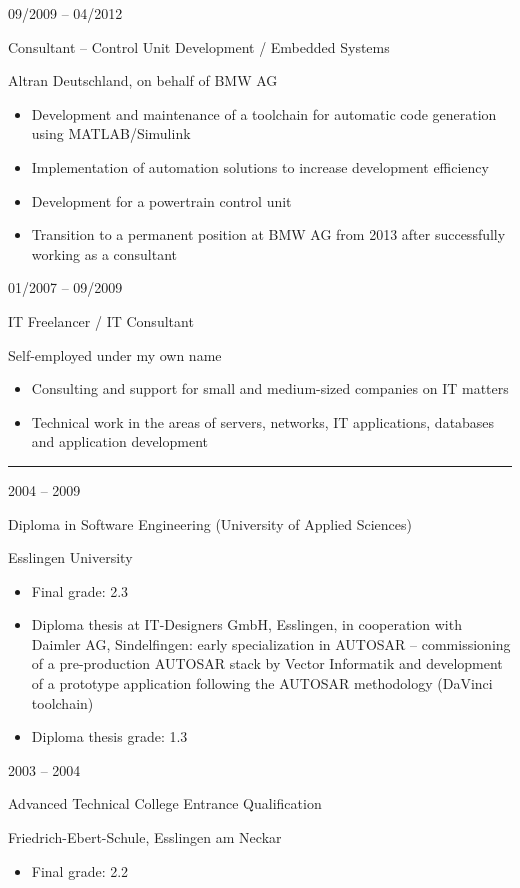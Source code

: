 \documentclass[a4paper,10pt]{article}
\newlength{\cvcolumngapwidth}
\newlength{\cvleftcolumnwidth}
\newlength{\cvrightcolumnwidth}
\newcommand{\cvsectionstyle}[1]{{\normalsize\cvsectionfont\textcolor{cvsectioncolor}{#1}}}
\newcommand{\cvtitlestyle}[1]{{\large\cvtitlefont\textcolor{cvtitlecolor}{#1}}}
\newcommand{\cvdurationstyle}[1]{{\small\cvdurationfont\textcolor{cvdurationcolor}{#1}}}
\newlength{\cvafteritemskipamount}
\newlength{\cvaftersectionskipamount}
\newlength{\cvaftertitleskipamount}
\newlength{\cvparskip}
\newcommand{\cvsection}[1]{
    \begin{minipage}[t]{\cvleftcolumnwidth}
        \raggedleft\cvsectionstyle{#1}
    \end{minipage}%
    \hspace{\cvcolumngapwidth}%
    \begin{minipage}[t]{\cvrightcolumnwidth}
        \textcolor{cvrulecolor}{\rule{\cvrightcolumnwidth}{0.3mm}}
    \end{minipage}
    \vspace{\cvaftersectionskipamount}
}
\newcommand{\cvitem}[2]{
    \begin{minipage}[t]{\cvleftcolumnwidth}
        \raggedleft #1
    \end{minipage}%
    \hspace{\cvcolumngapwidth}%
    \begin{minipage}[t]{\cvrightcolumnwidth}
        \setlength{\parskip}{\cvparskip} #2
    \end{minipage}
    \vspace{\cvafteritemskipamount}
}
\newcommand{\cvtitle}[1]{
    \cvtitlestyle{#1}
    \vspace{\cvaftertitleskipamount}
    \vspace{-\cvparskip}
}
\begin{document}
\cvitem{
    \cvdurationstyle{09/2009 -- 04/2012}
}{
    \cvtitle{Consultant -- Control Unit Development / Embedded Systems}

    Altran Deutschland, on behalf of BMW AG

    \begin{itemize}[leftmargin=*]
        \item Development and maintenance of a toolchain for automatic code generation using MATLAB/Simulink
        \item Implementation of automation solutions to increase development efficiency
        \item Development for a powertrain control unit
        \item Transition to a permanent position at BMW AG from 2013 after successfully working as a consultant
    \end{itemize}
}

\cvitem{
    \cvdurationstyle{01/2007 -- 09/2009}
}{
    \cvtitle{IT Freelancer / IT Consultant}

    Self-employed under my own name

    \begin{itemize}[leftmargin=*]
        \item Consulting and support for small and medium-sized companies on IT matters
        \item Technical work in the areas of servers, networks, IT applications, databases and application development
    \end{itemize}
}

\cvsection{EDUCATION}

\cvitem{
    \cvdurationstyle{2004 -- 2009}
}{
    \cvtitle{Diploma in Software Engineering (University of Applied Sciences)}

    Esslingen University

    \begin{itemize}[leftmargin=*]
        \item Final grade: 2.3
        \item Diploma thesis at IT-Designers GmbH, Esslingen, in cooperation with Daimler AG, Sindelfingen: early specialization in AUTOSAR -- commissioning of a pre-production AUTOSAR stack by Vector Informatik and development of a prototype application following the AUTOSAR methodology (DaVinci toolchain)
        \item Diploma thesis grade: 1.3
    \end{itemize}
}

\cvitem{
    \cvdurationstyle{2003 -- 2004}
}{
    \cvtitle{Advanced Technical College Entrance Qualification}

    Friedrich-Ebert-Schule, Esslingen am Neckar

    \begin{itemize}[leftmargin=*]
        \item Final grade: 2.2
    \end{itemize}
}
\end{document}

